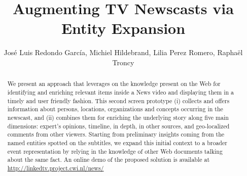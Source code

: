 \documentclass{llncs}
\begin{document}
\frontmatter          %
\pagestyle{headings}  %
\mainmatter              %

\title{Augmenting TV Newscasts via Entity Expansion}
\author{Jos\'e Luis Redondo Garc\'ia, Michiel Hildebrand, Lilia Perez Romero, Rapha\"el Troncy}


\maketitle              %


\begin{abstract}
We present an approach that leverages on the knowledge present on the Web for identifying and enriching relevant items inside a News video and displaying them in a timely and user friendly fashion. 
This second screen prototype (i) collects and offers information about persons, locations, organizations and concepts occurring in the newscast, and (ii) combines them for enriching the underlying story along five main dimensions: expert's opinions, timeline, in depth, in other sources, and geo-localized comments from other viewers.  
Starting from preliminary insights coming from the named entities spotted on the subtitles, we expand this initial context to a broader event representation by relying in the knowledge of other Web documents talking about the same fact. An online demo of the proposed solution is available at \url{http://linkedtv.project.cwi.nl/news/}


\end{abstract}

\end{document}
